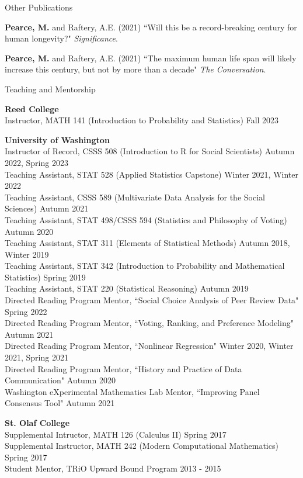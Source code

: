 \documentclass{resume} %
\begin{document}
\begin{rSection}{Other Publications}

{\bf Pearce, M.} and Raftery, A.E. (2021) ``Will this be a record-breaking century for human longevity?" {\em Significance}.

{\bf Pearce, M.} and Raftery, A.E. (2021) ``The maximum human life span will likely increase this century, but not by more than a decade" {\em The Conversation}.

\end{rSection}

\newpage
\begin{rSection}{Teaching and Mentorship}

{\bf Reed College}
\\ Instructor, MATH 141 (Introduction to Probability and Statistics) \hfill {Fall 2023}

{\bf University of Washington}
\\ Instructor of Record, CSSS 508 (Introduction to R for Social Scientists) \hfill {Autumn 2022, Spring 2023}
\\ Teaching Assistant, STAT 528 (Applied Statistics Capstone) \hfill {Winter 2021, Winter 2022}
\\ Teaching Assistant, CSSS 589 (Multivariate Data Analysis for the Social Sciences) \hfill Autumn 2021
\\ Teaching Assistant, STAT 498/CSSS 594 (Statistics and Philosophy of Voting) \hfill Autumn 2020
\\ Teaching Assistant, STAT 311 (Elements of Statistical Methods) \hfill {Autumn 2018, Winter 2019}
\\ Teaching Assistant, STAT 342 (Introduction to Probability and Mathematical Statistics) \hfill {Spring 2019}
\\ Teaching Assistant, STAT 220 (Statistical Reasoning) \hfill {Autumn 2019}
\\ Directed Reading Program Mentor, ``Social Choice Analysis of Peer Review Data" \hfill {Spring 2022}
\\ Directed Reading Program Mentor, ``Voting, Ranking, and Preference Modeling" \hfill {Autumn 2021}
\\ Directed Reading Program Mentor, ``Nonlinear Regression" \hfill {Winter 2020, Winter 2021, Spring 2021}
\\ Directed Reading Program Mentor, ``History and Practice of Data Communication" \hfill {Autumn 2020}
\\ Washington eXperimental Mathematics Lab Mentor, ``Improving Panel Consensus Tool" \hfill {Autumn 2021}

{\bf St. Olaf College}
\\ Supplemental Intructor, MATH 126 (Calculus II) \hfill {Spring 2017}
\\ Supplemental Instructor, MATH 242 (Modern Computational Mathematics) \hfill {Spring 2017}
\\ Student Mentor, TRiO Upward Bound Program \hfill {2013 - 2015}

\end{rSection}
\end{document}
